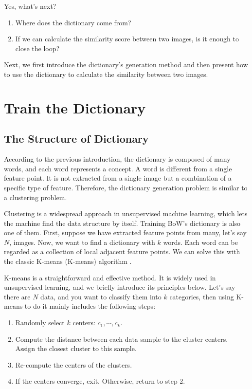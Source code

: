 Yes, what's next?
\begin{enumerate}
	\item Where does the dictionary come from?
	\item If we can calculate the similarity score between two images, is it enough to close the loop?
\end{enumerate}

Next, we first introduce the dictionary's generation method and then present how to use the dictionary to calculate the similarity between two images.

\section{Train the Dictionary}
\subsection{The Structure of Dictionary}
According to the previous introduction, the dictionary is composed of many words, and each word represents a concept. A word is different from a single feature point. It is not extracted from a single image but a combination of a specific type of feature. Therefore, the dictionary generation problem is similar to a clustering problem.

Clustering is a widespread approach in unsupervised machine learning, which lets the machine find the data structure by itself. Training BoW's dictionary is also one of them. First, suppose we have extracted feature points from many, let's say $N$, images. Now, we want to find a dictionary with $k$ words. Each word can be regarded as a collection of local adjacent feature points. We can solve this with the classic K-means (K-means) algorithm {\cite{Lloyd1982}}.

K-means is a straightforward and effective method. It is widely used in unsupervised learning, and we briefly introduce its principles below. Let's say there are $N$ data, and you want to classify them into $k$ categories, then using K-means to do it mainly includes the following steps:

\begin{mdframed}
	\begin{enumerate}
		\item Randomly select $k$ centers: $c_1, \cdots, c_k$.
		\item Compute the distance between each data sample to the cluster centers. Assign the closest cluster to this sample. 
		\item Re-compute the centers of the clusters. 
		\item If the centers converge, exit. Otherwise, return to step 2. 
	\end{enumerate}
\end{mdframed}

